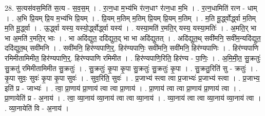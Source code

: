 \documentclass[17pt]{extarticle}
\begin{document}
28. स॒त्यस॑वस॒मिति॑ स॒त्य - स॒व॒स॒म् । . र॒त्न॒धा म॒भ्य॑भि र॑त्न॒धाꣳ र॑त्न॒धा म॒भि । . र॒त्न॒धामिति॑ रत्न - धाम् । . अ॒भि प्रि॒यम् प्रि॒य म॒भ्य॑भि प्रि॒यम् । . प्रि॒यम् म॒तिम् म॒तिम् प्रि॒यम् प्रि॒यम् म॒तिम् । . म॒ति मू॒र्द्ध्वोर्द्ध्वा म॒तिम् म॒ति मू॒र्द्ध्वा । . ऊ॒र्द्ध्वा यस्य॒ यस्यो॒र्द्ध्वोर्द्ध्वा यस्य॑ । . यस्या॒मति॑ र॒मति॒र् यस्य॒ यस्या॒मतिः॑ । . अ॒मति॒र् भा भा अ॒मति॑ र॒मति॒र् भाः । . भा अदि॑द्युत॒ ददि॑द्युत॒द् भा भा अदि॑द्युतत् । . अदि॑द्युत॒थ् सवी॑मनि॒ सवी॑म॒न्यदि॑द्युत॒ ददि॑द्युत॒थ् सवी॑मनि । . सवी॑मनि॒ हिर॑ण्यपाणि॒र्॒. हिर॑ण्यपाणिः॒ सवी॑मनि॒ सवी॑मनि॒ हिर॑ण्यपाणिः । . हिर॑ण्यपाणि रमिमीतामिमीत॒ हिर॑ण्यपाणि॒र्॒. हिर॑ण्यपाणि रमिमीत । . हिर॑ण्यपाणि॒रिति॒ हिर॑ण्य - पा॒णिः॒ । . अ॒मि॒मी॒त॒ सु॒क्रतुः॑ सु॒क्रतु॑ रमिमीतामिमीत सु॒क्रतुः॑ । . सु॒क्रतुः॑ कृ॒पा कृ॒पा सु॒क्रतुः॑ सु॒क्रतुः॑ कृ॒पा । . सु॒क्रतु॒रिति॑ सु - क्रतुः॑ । . कृ॒पा सुवः॒ सुवः॑ कृ॒पा कृ॒पा सुवः॑ । . सुव॒रिति॒ सुवः॑ । . प्र॒जाभ्य॑ स्त्वा त्वा प्र॒जाभ्यः॑ प्र॒जाभ्य॑ स्त्वा । . प्र॒जाभ्य॒ इति॑ प्र - जाभ्यः॑ । . त्वा॒ प्रा॒णाय॑ प्रा॒णाय॑ त्वा त्वा प्रा॒णाय॑ । . प्रा॒णाय॑ त्वा त्वा प्रा॒णाय॑ प्रा॒णाय॑ त्वा । . प्रा॒णायेति॑ प्र - अ॒नाय॑ । . त्वा॒ व्या॒नाय॑ व्या॒नाय॑ त्वा त्वा व्या॒नाय॑ । . व्या॒नाय॑ त्वा त्वा व्या॒नाय॑ व्या॒नाय॑ त्वा । . व्या॒नायेति॑ वि - अ॒नाय॑ । \newline
\end{document}
